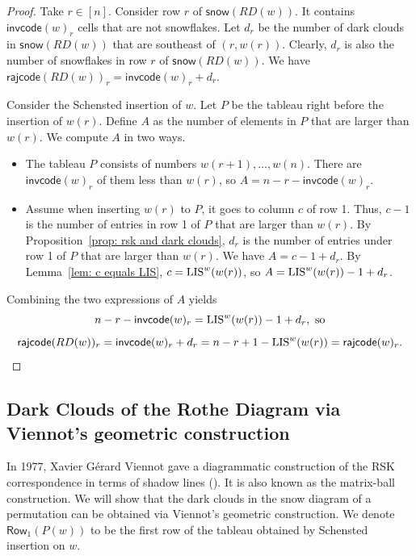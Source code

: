 \documentclass[ALCO]{cedram}
\newcommand{\snow}{\mathsf{snow}}
\newcommand{\rajcode}{\mathsf{rajcode}}
\newcommand{\invcode}{\mathsf{invcode}}
\newcommand{\Rowone}[1]
{{\mathsf{{Row}}}_1(P(#1))}
\begin{document}
\begin{proof}
Take $r \in [n]$.
Consider row $r$ of $\snow(RD(w))$.
It contains $\invcode(w)_r$ cells that are not snowflakes. 
Let $d_r$ be the number of dark clouds in $\snow(RD(w))$ 
that are southeast of $(r,w(r))$.
Clearly, $d_r$ is also the number of snowflakes in row $r$ of $\snow(RD(w))$.
We have $\rajcode(RD(w))_r = \invcode(w)_r + d_r$.

Consider the Schensted insertion of $w$.
Let $P$ be the tableau right before the insertion of $w(r)$.
Define $A$ as the number of elements
in $P$ that are larger than $w(r)$.
We compute $A$ in two ways. 
\begin{itemize}
\item The tableau $P$
consists of numbers 
$w(r+1), \dots, w(n)$.
There are $\invcode(w)_r$ of them 
less than $w(r)$,
so $A = n - r - \invcode(w)_r$.
\item
Assume when inserting $w(r)$ to $P$,
it goes to column $c$ of row 1. 
Thus,  
$c-1$ is the number of entries in row 1
of $P$ that are larger than $w(r)$.
By Proposition~\ref{prop: rsk and dark clouds},
$d_r$ is the number of entries 
under row 1 of $P$
that are larger than $w(r)$.
We have $A = c - 1 + d_r$.
By Lemma~\ref{lem: c equals LIS},
$c = \textup{LIS}^w(w(r))$,
so $A = \textup{LIS}^w(w(r)) - 1 + d_r$.
\end{itemize}

Combining the two expressions of $A$ 
yields
$$
 n - r - \invcode(w)_r = \textup{LIS}^w(w(r)) - 1 + d_r, \textrm{ so}
$$
$$
\rajcode(RD(w))_r = \invcode(w)_r + d_r
= n - r + 1 - \textup{LIS}^w(w(r))
= \rajcode(w)_r.
$$
\end{proof}


\subsection{Dark Clouds of the Rothe Diagram via Viennot's geometric construction}
\label{subsec.shadow.diagram}
In 1977, Xavier G{\'e}rard Viennot gave a diagrammatic construction of the RSK correspondence 
in terms of shadow lines (\cite{viennot}). It is also known as the matrix-ball construction. We will show that the dark clouds in the snow diagram of a permutation can be obtained via Viennot's geometric construction. 
We denote $\Rowone{w}$ to be the first row of the tableau obtained by Schensted insertion on $w$.
\end{document}
